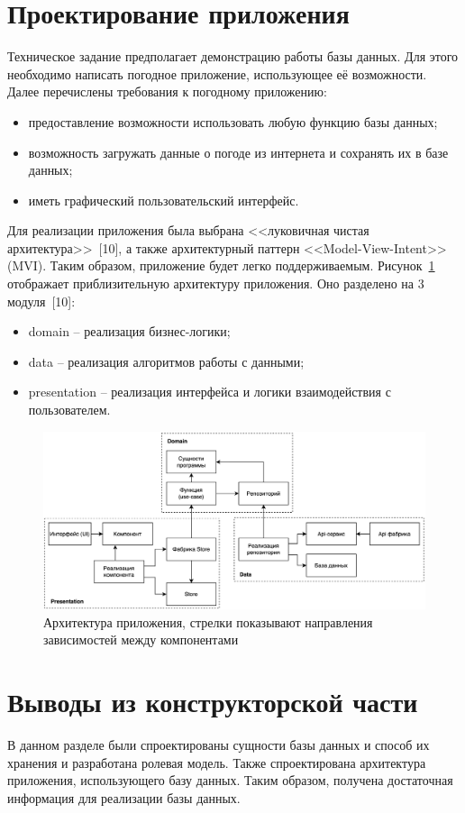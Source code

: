 \section{Проектирование приложения}
Техническое задание предполагает демонстрацию работы базы данных.
Для этого необходимо написать погодное приложение, использующее её возможности.
Далее перечислены требования к погодному приложению:
\begin{itemize}
    \item
        предоставление возможности использовать любую функцию базы данных;
    \item
        возможность загружать данные о погоде из интернета и сохранять их в базе данных;
    \item иметь графический пользовательский интерфейс.
\end{itemize}

Для реализации приложения была выбрана <<луковичная чистая архитектура>>~[10], а также архитектурный паттерн <<Model-View-Intent>> (MVI).
Таким образом, приложение будет легко поддерживаемым.
Рисунок~\ref{fig:component} отображает приблизительную архитектуру приложения.
Оно разделено на 3 модуля~[10]:
\begin{itemize}
    \item domain -- реализация бизнес-логики;
    \item data -- реализация алгоритмов работы с данными;
    \item presentation -- реализация интерфейса и логики взаимодействия с пользователем.
\end{itemize}

\begin{figure}[H]
	\centering
	\includegraphics[height=0.3\textheight, width=\textwidth]{tools/img/component.png}
	\caption{
        Архитектура приложения, стрелки показывают направления зависимостей между компонентами
    }
	\label{fig:component}
\end{figure}

\section*{Выводы из конструкторской части}
В данном разделе были спроектированы сущности базы данных и способ их хранения и разработана ролевая модель.
Также спроектирована архитектура приложения, использующего базу данных.
Таким образом, получена достаточная информация для реализации базы данных.